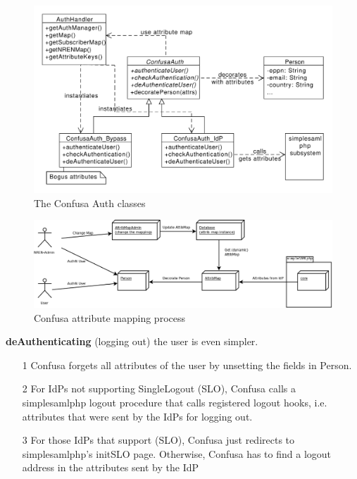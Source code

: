 \documentclass{scrartcl}
\begin{document}
\begin{figure}\label{confusa_auth_classes}
\begin{center}
\includegraphics[width=\textwidth]{auth_classes}
\caption{The Confusa Auth classes}
\end{center}
\end{figure}

\begin{figure}\label{confusa_attr_mapping}
\begin{center}
\includegraphics[width=\textwidth]{AttribMap.png}
\caption{Confusa attribute mapping process}
\end{center}
\end{figure}

\textbf{deAuthenticating} (logging out) the user is even simpler.

\begin{enumerate}
	\item[1] Confusa forgets all attributes of the user by unsetting the fields in Person.
	\item[2] For IdPs not supporting SingleLogout (SLO), Confusa calls a simplesamlphp logout procedure that calls registered logout hooks, i.e. attributes that were sent by the IdPs for logging out.
	\item[3] For those IdPs that support (SLO), Confusa just redirects to simplesamlphp's initSLO page. Otherwise, Confusa has to find a logout address in the attributes sent by the IdP
\end{enumerate}
\end{document}
